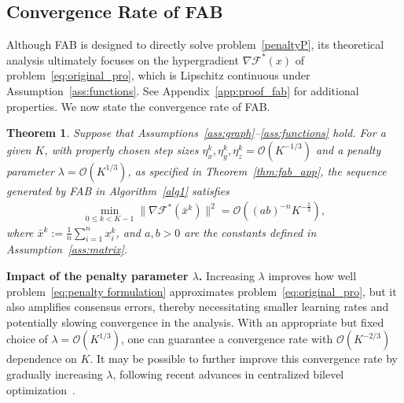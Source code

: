 \documentclass{article}
\theoremstyle{plain}
\newtheorem{theorem}{Theorem}[section]
\theoremstyle{definition}
\theoremstyle{remark}
\begin{document}
\subsection{Convergence Rate of FAB}

Although FAB is designed to directly solve problem~\eqref{penaltyP}, its theoretical analysis ultimately focuses on the hypergradient $\nabla \mathcal{F}^*(x)$ of problem~\eqref{eq:original_pro}, which is Lipschitz continuous under  Assumption~\ref{ass:functions}. See Appendix~\ref{app:proof_fab} for additional properties. We now state the convergence rate of FAB.

\begin{theorem}\label{thm:FAB_convergence}
    Suppose that Assumptions~\ref{ass:graph}–\ref{ass:functions} hold. For a given $K$, with properly chosen step sizes $\eta_{x}^k, \eta_{y}^k, \eta_{z}^k = \mathcal{O}(K^{-1/3})$ and a penalty parameter $\lambda = \mathcal{O}(K^{1/3})$, as specified in Theorem~\ref{thm:fab_app}, the sequence generated by FAB in Algorithm~\ref{alg1} satisfies 
    \begin{align}
        \min_{0 \le k < K-1} \|\nabla \mathcal{F}^*(\bar{x}^k)\|^2 = \mathcal{O}\left( (ab)^{-n} K^{-\frac{2}{3}} \right),
    \end{align}
    where $\bar{x}^k := \frac{1}{n}\sum_{i=1}^{n}x_{i}^{k}$, and $a, b>0$ are the constants defined in Assumption~\ref{ass:matrix}.
\end{theorem}

\textbf{Impact of the penalty parameter $\lambda$.} 
Increasing $\lambda$ improves how well problem~\eqref{eq:penalty formulation} approximates problem~\eqref{eq:original_pro}, but it also amplifies consensus errors, thereby necessitating smaller learning rates and potentially slowing convergence in the analysis. 
With an appropriate but fixed choice of $\lambda = \mathcal{O}(K^{1/3})$, one can guarantee a convergence rate with $\mathcal{O}(K^{-2/3})$ dependence on $K$. 
It may be possible to further improve this convergence rate by gradually increasing $\lambda$, following recent advances in centralized bilevel optimization~\cite{pmlr-v202-kwon23c,chennear2025}.
\end{document}
